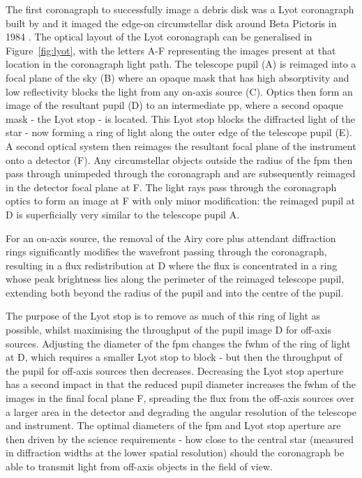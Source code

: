 \documentclass[letterpaper]{ar-1col}
\newcommand{\acc}[1]{\entry{\acs{#1}}{\acl{#1}}}
\begin{document}
\begin{armarginnote}[]
\acc{fpm}
\acc{ppm}
\acc{scfp}
\end{armarginnote}

The first coronagraph to successfully image a debris disk was a Lyot coronagraph built by \citet{Vilas87} and it imaged the edge-on circumstellar disk around Beta Pictoris in 1984 \citep{Smith84}.
%
The optical layout of the Lyot coronagraph can be generalised in Figure~\ref{fig:lyot}, with the letters A-F representing the images present at that location in the coronagraph light path.
%
The telescope pupil (A) is reimaged into a focal plane of the sky (B) where an opaque mask that has high absorptivity and low reflectivity blocks the light from any on-axis source (C).
%
Optics then form an image of the resultant pupil (D) to an intermediate \ac{pp}, where a second opaque mask - the Lyot stop - is located.
%
This Lyot stop blocks the diffracted light of the star - now forming a ring of light along the outer edge of the telescope pupil (E).
%
A second optical system then reimages the resultant focal plane of the instrument onto a detector (F).
%
%
Any circumstellar objects outside the radius of the \ac{fpm} then pass through unimpeded through the coronagraph and are subsequently reimaged in the detector focal plane at F.
%
The light rays pass through the coronagraph optics to form an image at F with only minor modification: the reimaged pupil at D is superficially very similar to the telescope pupil A.

For an on-axis source, the removal of the Airy core plus attendant diffraction rings significantly modifies the wavefront passing through the coronagraph, resulting in a flux redistribution at D where the flux is concentrated in a ring whose peak brightness lies along the perimeter of the reimaged telescope pupil, extending both beyond the radius of the pupil and into the centre of the pupil.

The purpose of the Lyot stop is to remove as much of this ring of light as possible, whilst maximising the throughput of the pupil image D for off-axis sources.
%
Adjusting the diameter of the \ac{fpm} changes the \ac{fwhm} of the ring of light at D, which requires a smaller Lyot stop to block - but then the throughput of the pupil for off-axis sources then decreases.
%
Decreasing the Lyot stop aperture has a second impact in that the reduced pupil diameter increases the \ac{fwhm} of the images in the final focal plane F, spreading the flux from the off-axis sources over a larger area in the detector and degrading the angular resolution of the telescope and instrument.
%
The optimal diameters of the \ac{fpm} and Lyot stop aperture are then driven by the science requirements - how close to the central star (measured in diffraction widths at the lower spatial resolution) should the coronagraph be able to transmit light from off-axis objects in the field of view.
\end{document}
